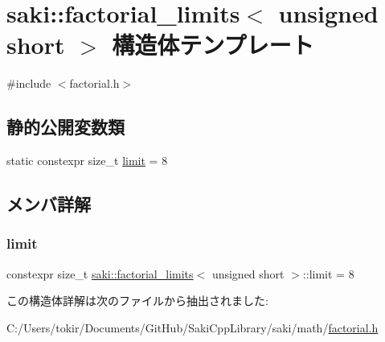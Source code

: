 \hypertarget{structsaki_1_1factorial__limits_3_01unsigned_01short_01_4}{}\section{saki\+:\+:factorial\+\_\+limits$<$ unsigned short $>$ 構造体テンプレート}
\label{structsaki_1_1factorial__limits_3_01unsigned_01short_01_4}


{\ttfamily \#include $<$factorial.\+h$>$}

\subsection*{静的公開変数類}
\begin{DoxyCompactItemize}
\item 
static constexpr size\+\_\+t \mbox{\hyperlink{structsaki_1_1factorial__limits_3_01unsigned_01short_01_4_a20ae30e175cc1beaf3cdede79bdc6488}{limit}} = 8
\end{DoxyCompactItemize}


\subsection{メンバ詳解}
\mbox{\label{structsaki_1_1factorial__limits_3_01unsigned_01short_01_4_a20ae30e175cc1beaf3cdede79bdc6488}} 
\subsubsection{\texorpdfstring{limit}{limit}}
{\footnotesize\ttfamily constexpr size\+\_\+t \mbox{\hyperlink{structsaki_1_1factorial__limits}{saki\+::factorial\+\_\+limits}}$<$ unsigned short $>$\+::limit = 8\hspace{0.3cm}{\ttfamily [static]}}



この構造体詳解は次のファイルから抽出されました\+:\begin{DoxyCompactItemize}
\item 
C\+:/\+Users/tokir/\+Documents/\+Git\+Hub/\+Saki\+Cpp\+Library/saki/math/\mbox{\hyperlink{factorial_8h}{factorial.\+h}}\end{DoxyCompactItemize}
